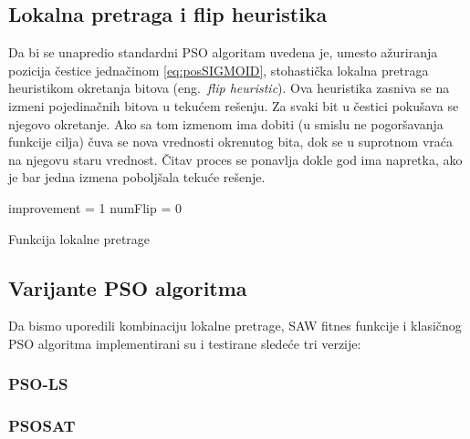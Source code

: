 \documentclass{article}
\begin{document}
\subsection{Lokalna pretraga i flip heuristika}
\label{sec:pso_lokalna_pretraga_flip}

Da bi se unapredio standardni PSO algoritam uvedena je, umesto ažuriranja pozicija čestice jednačinom \ref{eq:posSIGMOID}, stohastička lokalna pretraga heuristikom okretanja bitova (eng.~{\em flip heuristic}).
Ova heuristika zasniva se na izmeni pojedinačnih bitova u tekućem rešenju. Za svaki bit u čestici pokušava se njegovo okretanje. Ako sa tom izmenom ima dobiti (u smislu ne pogoršavanja funkcije cilja) čuva se nova vrednosti okrenutog bita, dok se u suprotnom vraća na njegovu staru vrednost. 
Čitav proces se ponavlja dokle god ima napretka, ako je bar jedna izmena poboljšala tekuće rešenje.


\begin{algorithm}[H]
\SetAlgoLined
{}

\BlankLine
 improvement = 1\;
 numFlip = 0\;
 \caption{Funkcija lokalne pretrage}
\end{algorithm}


\subsection{Varijante PSO algoritma}
\label{sec:pso_varijante}

Da bismo uporedili kombinaciju lokalne pretrage, SAW fitnes funkcije i klasičnog PSO algoritma implementirani su i testirane sledeće tri verzije: \\

\subsubsection{PSO-LS}
\label{sec:psols}

\subsubsection{PSOSAT}
\label{sec:psosat}
\end{document}
